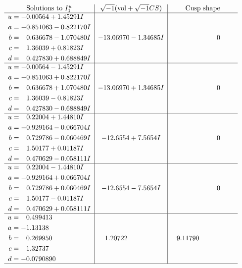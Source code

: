 \documentclass[1p]{elsarticle_modified}
\theoremstyle{definition}
\newcommand{\I}{\sqrt{-1}}
\begin{document}
$$\begin{array}{c|c|c}
\text{Solutions to }I^u_{1}& \I (\text{vol} + \sqrt{-1}CS) & \text{Cusp shape}\\
 \hline 
\begin{aligned}
u &= -0.00564 + 1.45291 I \\
a &= -0.851063 - 0.822170 I \\
b &= \phantom{-}0.636678 - 1.070480 I \\
c &= \phantom{-}1.36039 + 0.81823 I \\
d &= \phantom{-}0.427830 + 0.688849 I\end{aligned}
 & -13.06970 - 1.34685 I & \phantom{-0.000000 } 0 \\ \hline\begin{aligned}
u &= -0.00564 - 1.45291 I \\
a &= -0.851063 + 0.822170 I \\
b &= \phantom{-}0.636678 + 1.070480 I \\
c &= \phantom{-}1.36039 - 0.81823 I \\
d &= \phantom{-}0.427830 - 0.688849 I\end{aligned}
 & -13.06970 + 1.34685 I & \phantom{-0.000000 } 0 \\ \hline\begin{aligned}
u &= \phantom{-}0.22004 + 1.44810 I \\
a &= -0.929164 - 0.066704 I \\
b &= \phantom{-}0.729786 - 0.060469 I \\
c &= \phantom{-}1.50177 + 0.01187 I \\
d &= \phantom{-}0.470629 - 0.058111 I\end{aligned}
 & -12.6554 + 7.5654 I & \phantom{-0.000000 } 0 \\ \hline\begin{aligned}
u &= \phantom{-}0.22004 - 1.44810 I \\
a &= -0.929164 + 0.066704 I \\
b &= \phantom{-}0.729786 + 0.060469 I \\
c &= \phantom{-}1.50177 - 0.01187 I \\
d &= \phantom{-}0.470629 + 0.058111 I\end{aligned}
 & -12.6554 - 7.5654 I & \phantom{-0.000000 } 0 \\ \hline\begin{aligned}
u &= \phantom{-}0.499413\phantom{ +0.000000I} \\
a &= -1.13138\phantom{ +0.000000I} \\
b &= \phantom{-}0.269950\phantom{ +0.000000I} \\
c &= \phantom{-}1.32737\phantom{ +0.000000I} \\
d &= -0.0790890\phantom{ +0.000000I}\end{aligned}
 & \phantom{-}1.20722\phantom{ +0.000000I} & \phantom{-}9.11790\phantom{ +0.000000I}\\
 \hline 
 \end{array}$$\newpage\newpage\renewcommand{\arraystretch}{1}
\end{document}
